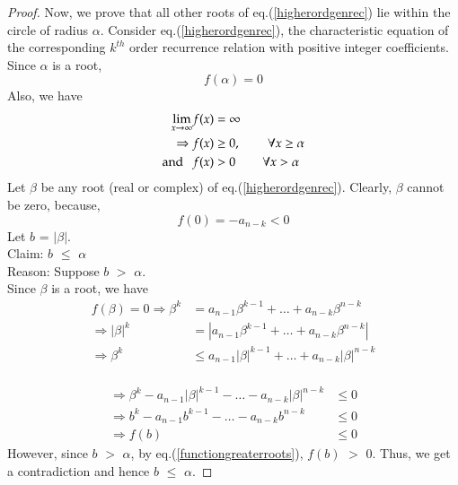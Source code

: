 \begin{multicols}{2}
\begin{proof}
Now, we prove that all other roots of eq.(\ref{higherordgenrec}) lie within the circle of radius $\alpha$. Consider eq.(\ref{higherordgenrec}), the characteristic equation of the corresponding $k^{th}$ order recurrence relation with positive integer coefficients. Since $\alpha$ is a root, 
   \begin{equation*}
     f(\alpha) = 0
   \end{equation*}
Also, we have
 \begin{align}
  \displaystyle{\lim_{x\rightarrow \infty}} f(x) &= \infty \nonumber\\
  \Rightarrow   f(x) &\ge 0, \hspace{0.3in} \forall x \ge \alpha \label{eq-11.6}\\
  \textup{and}\hspace{0.1in} f(x) &> 0  \hspace{0.3in} \forall x > \alpha \label{eq-11.7}          
 \end{align}
Let $\beta$ be any root (real or complex) of eq.(\ref{higherordgenrec}). Clearly, $\beta$ cannot be zero, because,
 \begin{equation}\nonumber
 f(0) = -a_{n-k} < 0
  \end{equation}
Let $b$ = $|\beta|$.\\
Claim: $b$ $\le$ $\alpha$\\
Reason: Suppose $b$ $>$ $\alpha$.\\
 Since $\beta$ is a root, we have
 \begin{align*}
 f(\beta) = 0 \Rightarrow \beta^{k}  &=  a_{n-1}\beta^{k-1} + \ldots + a_{n-k}\beta^{n-k} \nonumber\\
              \Rightarrow |\beta|^{k}  &=  |a_{n-1}\beta^{k-1} + \ldots + a_{n-k}\beta^{n-k}|\nonumber\\
             \Rightarrow \beta^{k}  &\leq  a_{n-1}|\beta|^{k-1} + \ldots + a_{n-k}|\beta|^{n-k}\nonumber\\
   \end{align*}
   
   \vspace{-1.5cm}
   
   \begin{align}
              \Rightarrow \beta^{k}-a_{n-1}|\beta|^{k-1} - \ldots - a_{n-k}|\beta|^{n-k} &\leq 0 \nonumber\\
              \Rightarrow b^{k}-a_{n-1}b^{k-1} - \ldots - a_{n-k}b^{n-k} &\leq 0 \nonumber\\
  \Rightarrow f(b) &\leq 0\label{eq-11.8} 
 \end{align}
However, since $b$ $>$ $\alpha$, by eq.(\ref{functiongreaterroots}), $f(b)$ $>$ 0. Thus, we get a contradiction and hence $b$ $\le$ $\alpha$.


\end{proof}
\end{multicols}
